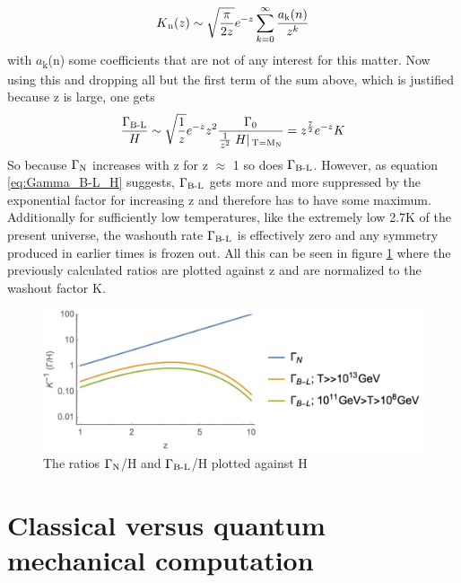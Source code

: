 \begin{equation*}
	K\textsubscript{n}(z)\sim\sqrt{\frac{\pi}{2z}}e^{-z}\sum_{k=0}^{\infty}\frac{a\textsubscript{k}(n)}{z^k}
\end{equation*}
with $a$\textsubscript{k}(n) some coefficients that are not of any interest for this matter. Now using this and dropping all but the first term of the sum above, which is justified because z is large, one gets
\begin{equation}
	\frac{\Gamma\textsubscript{B-L}}{H}\sim\sqrt{\frac{1}{z}}e^{-z}z^2\frac{\Gamma_0}{\frac{1}{z^2}\left.H\right|\textsubscript{T=M\textsubscript{N}}}=z^\frac{7}{2}e^{-z}K
	\label{eq:Gamma_B-L_H}
\end{equation}
So because $\Gamma\textsubscript{N}$ increases with z for z $\approx$ 1 so does $\Gamma\textsubscript{B-L}$. However, as equation \ref{eq:Gamma_B-L_H} suggests, $\Gamma\textsubscript{B-L}$ gets more and more suppressed by the exponential factor for increasing z and therefore has to have some maximum. Additionally for sufficiently low temperatures, like the extremely low 2.7K of the present universe, the washouth rate $\Gamma\textsubscript{B-L}$ is effectively zero and any symmetry produced in earlier times is frozen out. 
All this can be seen in figure \ref{fig:rates} where the previously calculated ratios are plotted against z and are normalized to the washout factor K.
\begin{figure}[H]
	\centering
	\includegraphics[width=0.8\linewidth]{Images/rates}
	\caption{The ratios $\Gamma\textsubscript{N}$/H and $\Gamma\textsubscript{B-L}$/H plotted against H}
	\label{fig:rates}
\end{figure}
\section{Classical versus quantum mechanical computation}
